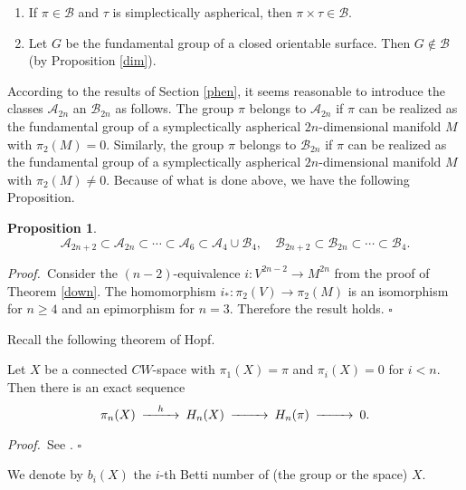 \documentclass[12pt, twoside]{amsart}
\theoremstyle{plain}
\newtheorem{prop}[theorem]{Proposition}
\theoremstyle{definition}
\numberwithin{equation}{section}
\def\hqed{\hfill\hfill$\square$}
\def\AAA{{\mathcal A}}
\def\BBB{{\mathcal B}}
\def\m{\medskip}
\def\p{{\it Proof.\ }}
\begin{document}
\begin{enumerate}
\item If $\pi \in \BBB$ and $\tau$ is simplectically aspherical, then $\pi
\times \tau \in \BBB$.
\item Let $G$ be the fundamental  group of a closed orientable surface. Then 
$G
\notin \BBB$ (by Proposition \ref{dim}). 
\end{enumerate}

\m
According to the results of Section \ref{phen}, it seems 
reasonable to introduce the classes $\AAA_{2n}$ an 
$\BBB_{2n}$ as follows. The group $\pi$ belongs to $\AAA_{2n}$ if $\pi$ can be 
realized as the fundamental group of a symplectically
aspherical $2n$-dimensional manifold $M$ with $\pi_2(M)=0$. Similarly, the group 
$\pi$ belongs to $\BBB_{2n}$ if $\pi$ can be realized as the fundamental group 
of a symplectically
aspherical $2n$-dimensional manifold $M$ with $\pi_2(M)\ne 0$. Because of 
what is done above, we have the following Proposition.

\begin{prop}\label{chain}
$$
\AAA_{2n+2} \subset \AAA_{2n} \subset \cdots \subset \AAA_6\subset \AAA_4\cup 
\BBB_4, \quad  \BBB_{2n+2}
\subset \BBB_{2n} \subset \cdots \subset \BBB_4.
$$
\end{prop}

\p Consider the $(n-2)$-equivalence $i: V^{2n-2} \to M^{2n}$ from the proof of 
Theorem \ref{down}. The homomorphism $i_*: \pi_2(V) \to \pi_2(M)$ is an 
isomorphism for $n\ge 4$ and an epimorphism for $n=3$. Therefore the result 
holds.
\hqed

Recall the following theorem of Hopf.

\begin{theorem}
\label{hopf}
 Let $X$ be a connected $CW$-space with
$\pi_1(X)=\pi$ and $\pi_i(X)=0$ for $i<n$. Then there is an exact sequence
$$
\CD
\pi_n(X) @>h>> H_n(X) @>>> H_n(\pi) @>>> 0.
\endCD
$$   
\end{theorem}

\p See \cite[Theorem II.5.2]{B}.
\hqed

We denote by $b_i(X)$ the $i$-th Betti number of (the group or the space) $X$.
\end{document}
